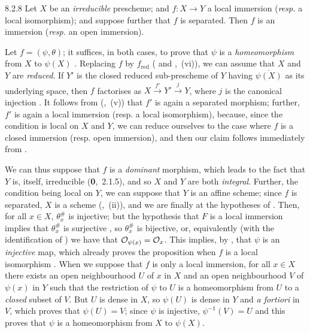 \documentclass[../main.tex]{subfiles}
\begin{document}
\begin{env}[Proposition]{8.2.8}
    Let $X$ be an \emph{irreducible} prescheme; and $f\colon X\to Y$ a local immersion (\emph{resp.} a local isomorphism); and suppose further that $f$ is separated.
    Then $f$ is an immersion (\emph{resp.} an open immersion).
\end{env}

Let $f=(\psi,\theta)$; it suffices, in both cases, to prove that $\psi$ is a \emph{homeomorphism} from $X$ to $\psi(X)$ .
Replacing $f$ by $f_\mathrm{red}$ ( and ,~(vi)), we can assume that $X$ and $Y$ are \emph{reduced}.
If $Y'$ is the closed reduced sub-prescheme of $Y$ having $\overline{\psi(X)}$ as its underlying space, then $f$ factorises as $X\xrightarrow{f'}Y'\xrightarrow{j}Y$, where $j$ is the canonical injection .
It follows from (,~(v)) that $f'$ is again a separated morphism; further, $f'$ is again a local immersion (resp. a local isomorphism), because, since the condition is local on $X$ and $Y$, we can reduce ourselves to the case where $f$ is a closed immersion (resp. open immersion), and then our claim follows immediately from .

We can thus suppose that $f$ is a \emph{dominant} morphism, which leads to the fact that $Y$ is, itself, irreducible (\textbf{0},~2.1.5), and so $X$ and $Y$ are both \emph{integral}.
Further, the condition being local on $Y$, we can suppose that $Y$ is an affine scheme; since $f$ is separated, $X$ is a scheme (,~(ii)), and we are finally at the hypotheses of .
Then, for all $x\in X$, $\theta_x^\#$ is injective; but the hypothesis that $F$ is a local immersion implies that $\theta_x^\#$ is surjective , so $\theta_x^\#$ is bijective, or, equivalently (with the identification of ) we have that $\mathcal{O}_{\psi(x)}=\mathcal{O}_x$.
This implies, by , that $\psi$ is an \emph{injective} map, which already proves the proposition when $f$ is a local isomorphism .
When we suppose that $f$ is only a local immersion, for all $x\in X$ there exists an open neighbourhood $U$ of $x$ in $X$ and an open neighbourhood $V$ of $\psi(x)$ in $Y$ such that the restriction of $\psi$ to $U$ is a homeomorphism from $U$ to a \emph{closed} subset of $V$.
But $U$ is dense in $X$, so $\psi(U)$ is dense in $Y$ and \emph{a fortiori} in $V$, which proves that $\psi(U)=V$; since $\psi$ is injective, $\psi^{-1}(V)=U$ and this proves that $\psi$ is a homeomorphism from $X$ to $\psi(X)$.
\end{document}

